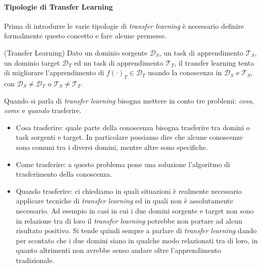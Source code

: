 \paragraph{Tipologie di Transfer Learning} Prima di introdurre le varie tipologie di \textit{transfer learning} è necessario definire formalmente questo concetto e fare alcune premesse.
\begin{definition}{(Transfer Learning)}
    Dato un dominio sorgente $\mathcal{D}_S$, un task di apprendimento $\mathcal{T}_S$, un dominio target $\mathcal{D}_T$ ed un task di apprendimento $\mathcal{T}_T$, il transfer learning tenta di migliorare l'apprendimento di $f(\cdot)_T \in \mathcal{D}_T$ usando la conoscenza in $\mathcal{D}_S$ e $\mathcal{T}_S$, con $\mathcal{D}_S \neq \mathcal{D}_T$ o $\mathcal{T}_S \neq \mathcal{T}_T$.
\end{definition}
Quando si parla di \textit{transfer learning} bisogna mettere in conto tre problemi: \emph{cosa}, \emph{come} e \emph{quando} trasferire.
\begin{itemize}
    \item Cosa trasferire: quale parte della conoscenza bisogna trasferire tra domini o task sorgenti e target. In particolare possiamo dire che alcune conoscenze sono comuni tra i diversi domini, mentre altre sono specifiche. 
    \item Come trasferire: a questo problema pone una soluzione l'algoritmo di trasferimento della conoscenza.
    \item Quando trasferire: ci chiediamo in quali situazioni è realmente necessario applicare tecniche di \textit{transfer learning} ed in quali non è assolutamente necessario. Ad esempio in casi in cui i due domini sorgente e target non sono in relazione tra di loro il \textit{transfer learning} potrebbe non portare ad alcun risultato positivo. Si tende quindi sempre a parlare di \textit{transfer learning} dando per scontato che i due domini siano in qualche modo relazionati tra di loro, in quanto altrimenti non avrebbe senso andare oltre l'apprendimento tradizionale. 
\end{itemize}

